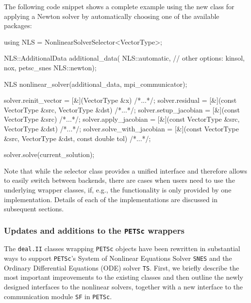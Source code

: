 \documentclass{ansarticle-preprint}
\newcommand{\specialword}[1]{\texttt{#1}}
\newcommand{\dealii}{{\specialword{deal.II}}\xspace}
\newcommand{\petsc}{\specialword{PETSc}\xspace}
\newcommand{\snes}{{\specialword{SNES}}\xspace}
\newcommand{\ts}{{\specialword{TS}}\xspace}
\newcommand{\petscsf}{{\specialword{SF}}\xspace}
\begin{document}
The following code snippet shows a complete example using the new class for applying a Newton solver
by automatically choosing one of the available packages:
\begin{c++}
using NLS = NonlinearSolverSelector<VectorType>;

NLS::AdditionalData additional_data(
  NLS::automatic, // other options: kinsol, nox, petsc_snes 
  NLS::newton);
  
NLS nonlinear_solver(additional_data, mpi_communicator);

solver.reinit_vector       = [&](VectorType &x) {/*...*/};    
solver.residual            = [&](const VectorType &src,
                                 VectorType       &dst) {/*...*/};
solver.setup_jacobian      = [&](const VectorType &src) {/*...*/};
solver.apply_jacobian      = [&](const VectorType &src,
                                 VectorType       &dst) {/*...*/};
solver.solve_with_jacobian = [&](const VectorType &src,
                                 VectorType       &dst,
                                 const double      tol) {/*...*/};

solver.solve(current_solution);    
\end{c++}

Note that while the selector class provides a unified interface and therefore allows to
easily switch between backends, there are cases when users need to use the underlying
wrapper classes, if, e.g., the functionality is only provided by one implementation.
Details of each of the implementations are discussed in subsequent sections.



\subsubsection{Updates and additions to the \petsc wrappers}\label{sec:petsc}

The \dealii classes wrapping \petsc objects have been rewritten in
substantial ways
to support \petsc's System of Nonlinear Equations Solver \snes and the Ordinary Differential Equations (ODE)
solver \ts \cite{abhyankar2018petsc}.
First, we briefly describe the most important improvements to the existing
classes and then outline the newly designed interfaces to the nonlinear solvers, together
with a new interface to the communication module \petscsf in \petsc \cite{zhang2021petscsf}.
\end{document}
